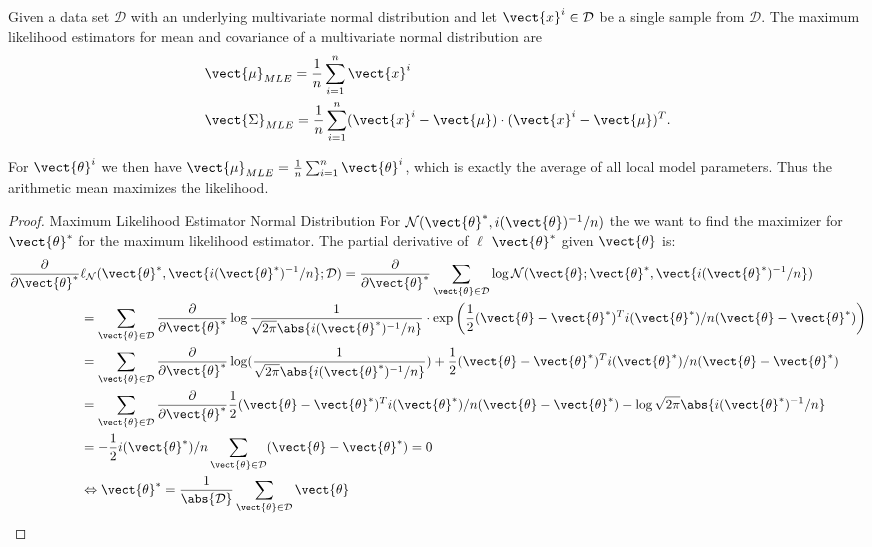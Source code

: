 \begin{tcolorbox}
    Given a data set $\mathcal{D}$ with an underlying multivariate normal distribution and let $\vect{x}^i \in \mathcal{D}$ be a single sample from $\mathcal{D}$.
    The maximum likelihood estimators for mean and covariance of a multivariate normal distribution are
    \begin{equation}
        \begin{split}
            &\vect{\mu}_{MLE} = \frac{1}{n} \sum_{i=1}^n \vect{x}^i \\
        &\vect{\Sigma}_{MLE} = \frac{1}{n} \sum_{i=1}^n (\vect{x}^i - \vect{\mu}) \cdot  (\vect{x}^i - \vect{\mu})^T.
        \end{split}
    \end{equation}
\end{tcolorbox}
For $\vect{\theta}^i$ we then have $\vect{\mu}_{MLE} = \frac{1}{n} \sum_{i=1}^n \vect{\theta}^i$, which is exactly the average of all local model parameters.
Thus the arithmetic mean maximizes the likelihood.
\begin{proof}{Maximum Likelihood Estimator Normal Distribution}
    For $\mathcal{N}(\vect{\theta}^*, i(\vect{\theta})^{-1}/n)$ the we want to find the maximizer for $\vect{\theta}^*$ for the maximum likelihood estimator. 
    The partial derivative of $\ell$ \wrt $\vect{\theta}^*$ given $\vect{\theta}$ is:
    \begin{equation}
        \begin{split}
        \frac{\partial}{\partial \vect{\theta}^*}&\ell_{\mathcal{N}}(\vect{\theta}^*, \vect{i(\vect{\theta}^*)^{-1}/n}; \mathcal{D}) =  \frac{\partial}{\partial \vect{\theta}^*} \sum_{\vect{\theta} \in \mathcal{D}} \log \mathcal{N}(\vect{\theta}; \vect{\theta}^*, \vect{i(\vect{\theta}^*)^{-1}/n})\\
        &=  \sum_{\vect{\theta} \in \mathcal{D}} \frac{\partial}{\partial \vect{\theta}^*} \log \frac{1}{\sqrt{2 \pi} \abs{i(\vect{\theta}^*)^{-1}/n}} \cdot \exp\bigg(\frac{1}{2} (\vect{\theta} - \vect{\theta}^*)^Ti(\vect{\theta}^*)/n(\vect{\theta} - \vect{\theta}^*) \bigg) \\
        &=  \sum_{\vect{\theta} \in \mathcal{D}} \frac{\partial}{\partial \vect{\theta}^*} \log (\frac{1}{\sqrt{2 \pi} \abs{i(\vect{\theta}^*)^{-1}/n}}) + \frac{1}{2} (\vect{\theta} - \vect{\theta}^*)^Ti(\vect{\theta}^*)/n(\vect{\theta} - \vect{\theta}^*) \\
        &=  \sum_{\vect{\theta} \in \mathcal{D}} \frac{\partial}{\partial \vect{\theta}^*} \frac{1}{2} (\vect{\theta} - \vect{\theta}^*)^Ti(\vect{\theta}^*)/n(\vect{\theta} - \vect{\theta}^*) - \log \sqrt{2 \pi} \abs{i(\vect{\theta}^*)^{-1}/n} \\
        &= - \frac{1}{2} i(\vect{\theta}^*)/n \sum_{\vect{\theta} \in \mathcal{D}} (\vect{\theta} - \vect{\theta}^*) = 0 \\
        &\Leftrightarrow \vect{\theta}^* = \frac{1}{\abs{\mathcal{D}}} \sum_{\vect{\theta} \in \mathcal{D}}  \vect{\theta}
        \end{split}
    \end{equation}
\end{proof}

